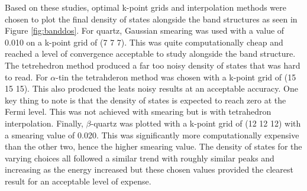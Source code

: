 \documentclass[12pt]{article}
\begin{document}
\bigskip

\noindent Based on these studies, optimal k-point grids and interpolation methods were chosen to plot the final density of states alongside the band structures as seen in Figure \ref{fig:banddos}. For quartz, Gaussian smearing was used with a value of 0.010 on a k-point grid of (7 7 7). This was quite computationally cheap and reached a level of convergence acceptable to study alongside the band structure. The tetrehedron method produced a far too noisy density of states that was hard to read. For $\alpha$-tin the tetrahderon method was chosen with a k-point grid of (15 15 15). This also prodcued the leats noisy results at an acceptable accuracy. One key thing to note is that the density of states is expected to reach zero at the Fermi level. This was not achieved with smearing but is with tetrahedron interpolation. Finally, $\beta$-quartz was plotted with a k-point grid of (12 12 12) with a smearing value of 0.020. This was significantly more computationally expensive than the other two, hence the higher smearing value. The density of states for the varying choices all followed a similar trend with roughly similar peaks and increasing as the energy increased but these chosen values provided the clearest result for an acceptable level of expense.
\end{document}
